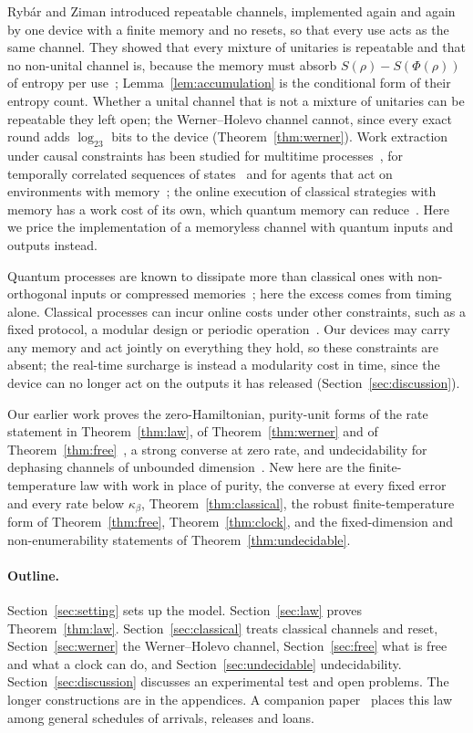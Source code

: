 \documentclass[11pt]{article}
\theoremstyle{definition}
\theoremstyle{remark}
\newcommand{\Trt}{\kappa_\beta}
\begin{document}
Ryb\'ar and Ziman introduced repeatable channels, implemented again and again by one device with a finite memory and no resets, so that every use acts as the same channel. They showed that every mixture of unitaries is repeatable and that no non-unital channel is, because the memory must absorb $S(\rho)-S(\Phi(\rho))$ of entropy per use~\cite{RybarZiman}; Lemma~\ref{lem:accumulation} is the conditional form of their entropy count. Whether a unital channel that is not a mixture of unitaries can be repeatable they left open; the Werner--Holevo channel cannot, since every exact round adds $\log_23$ bits to the device (Theorem~\ref{thm:werner}). Work extraction under causal constraints has been studied for multitime processes~\cite{ZambonAdesso}, for temporally correlated sequences of states~\cite{HuangTOFE} and for agents that act on environments with memory~\cite{Fiderer26}; the online execution of classical strategies with memory has a work cost of its own, which quantum memory can reduce~\cite{Thompson25}. Here we price the implementation of a memoryless channel with quantum inputs and outputs instead.

Quantum processes are known to dissipate more than classical ones with non-orthogonal inputs or compressed memories~\cite{BedinghamMaroney,LoomisCrutchfield20,RiechersGu21}; here the excess comes from timing alone. Classical processes can incur online costs under other constraints, such as a fixed protocol, a modular design or periodic operation~\cite{KolchinskyWolpert21,BMC18,OuldridgeWolpert23}. Our devices may carry any memory and act jointly on everything they hold, so these constraints are absent; the real-time surcharge is instead a modularity cost in time, since the device can no longer act on the outputs it has released (Section~\ref{sec:discussion}).

Our earlier work proves the zero-Hamiltonian, purity-unit forms of the rate statement in Theorem~\ref{thm:law}, of Theorem~\ref{thm:werner} and of Theorem~\ref{thm:free}~\cite{Memory,ImmediateDelivery,ClosedMemory}, a strong converse at zero rate, and undecidability for dephasing channels of unbounded dimension~\cite{Flagship}. New here are the finite-temperature law with work in place of purity, the converse at every fixed error and every rate below $\Trt$, Theorem~\ref{thm:classical}, the robust finite-temperature form of Theorem~\ref{thm:free}, Theorem~\ref{thm:clock}, and the fixed-dimension and non-enumerability statements of Theorem~\ref{thm:undecidable}.

\paragraph{Outline.} Section~\ref{sec:setting} sets up the model. Section~\ref{sec:law} proves Theorem~\ref{thm:law}. Section~\ref{sec:classical} treats classical channels and reset, Section~\ref{sec:werner} the Werner--Holevo channel, Section~\ref{sec:free} what is free and what a clock can do, and Section~\ref{sec:undecidable} undecidability. Section~\ref{sec:discussion} discusses an experimental test and open problems. The longer constructions are in the appendices. A companion paper~\cite{TimeOrder} places this law among general schedules of arrivals, releases and loans.
\end{document}

